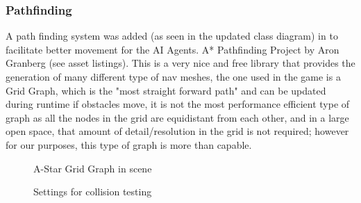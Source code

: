 \documentclass[12pt]{report}
\begin{document}
\subsubsection{Pathfinding}
A path finding system was added (as seen in the updated class diagram) in to facilitate better movement for the AI Agents. A* Pathfinding Project by Aron Granberg (see asset listings). This is a very nice and free library that provides the generation of many different type of nav meshes, the one used in the game is a Grid Graph, which is the "most straight forward path" and can be updated during runtime if obstacles move, it is not the most performance efficient type of graph as all the nodes in the grid are equidistant from each other, and in a large open space, that amount of detail/resolution in the grid is not required; however for our purposes, this type of graph is more than capable. 
\cite{astarPathfinding}
\begin{figure}[H]
    \begin{minipage}{.5\textwidth}
        \centering
        \caption{A-Star Grid Graph in scene}
    \end{minipage}
    \begin{minipage}{.5\textwidth}
        \centering
        \caption{Settings for collision testing}
    \end{minipage}
\end{figure}
\end{document}
